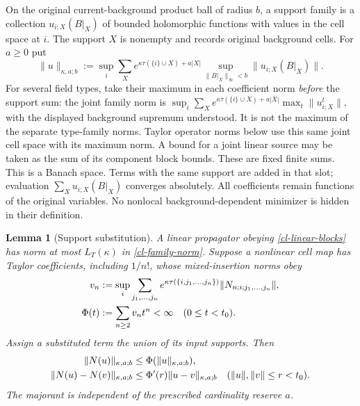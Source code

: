 \documentclass[11pt]{article}
\newtheorem{lemma}[theorem]{Lemma}
\theoremstyle{remark}\newtheorem{remark}[theorem]{Remark}
\begin{document}
On the original current-background product ball of radius $b$, a support
family is a collection $u_{i;X}(B|_X)$ of bounded holomorphic functions
with values in the cell space at $i$. The support $X$ is nonempty and
records original background cells. For $a\ge0$ put
\begin{equation}
 \|u\|_{\kappa,a;b}
 :=\sup_i\sum_X e^{\kappa\tau(\{i\}\cup X)+a|X|}
       \sup_{\|B|_X\|_\infty<b}\|u_{i;X}(B|_X)\|.             \label{cl-family-norm}
\end{equation}
For several field types, take their maximum in each coefficient norm
\emph{before} the support sum: the joint family norm is
$\sup_i\sum_X e^{\kappa\tau(\{i\}\cup X)+a|X|}
\max_t\|u^t_{i;X}\|$, with the displayed background supremum understood.
It is not the maximum of the separate type-family norms. Taylor
operator norms below use this same joint cell space with its maximum
norm. A bound for a joint linear source may be taken as the sum of its
component block bounds. These are fixed finite sums.
This is a Banach space. Terms with the same support are added in that
slot; evaluation $\sum_Xu_{i;X}(B|_X)$ converges absolutely. All
coefficients remain functions of the original variables. No nonlocal
background-dependent minimizer is hidden in their definition.

\begin{lemma}[Support substitution]\label{cl-substitution}
A linear propagator obeying \eqref{cl-linear-blocks} has norm at most
$L_T(\kappa)$ in \eqref{cl-family-norm}. Suppose a nonlinear cell map has
Taylor coefficients, including $1/n!$, whose mixed-insertion norms obey
\begin{align}
 v_n&:=\sup_i\sum_{j_1,\ldots,j_n}
 e^{\kappa\tau(\{i,j_1,\ldots,j_n\})}
       \|N_{n;i;j_1,\ldots,j_n}\|,\notag\\
 \Phi(t)&:=\sum_{n\ge2}v_nt^n<\infty\quad(0\le t<t_0).
                                                               \label{cl-vertex-majorant}
\end{align}
Assign a substituted term the union of its input supports. Then
\begin{align}
 \|N(u)\|_{\kappa,a;b}&\le\Phi(\|u\|_{\kappa,a;b}),\notag\\
 \|N(u)-N(v)\|_{\kappa,a;b}&\le\Phi'(r)\|u-v\|_{\kappa,a;b}
 \quad(\|u\|,\|v\|\le r<t_0).                              \label{cl-substitution-bound}
\end{align}
The majorant is independent of the prescribed cardinality reserve $a$.
\end{lemma}
\end{document}
